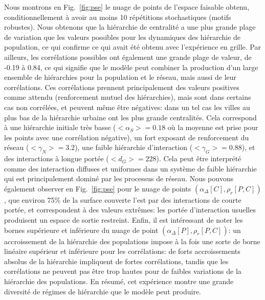 \documentclass[english,fleqn,allpages]{ISTE_science}[2018/07/30]
\begin{document}
{Nous montrons en Fig.~\ref{fig:pse} le nuage de points de l'espace faisable obtenu, conditionnellement à avoir au moins 10 répétitions stochastiques (motifs robustes). Nous obtenons que la hiérarchie de centralité a une plus grande plage de variation que les valeurs possibles pour les dynamiques des hiérarchie de population, ce qui confirme ce qui avait été obtenu avec l'expérience en grille. Par ailleurs, les corrélations possibles ont également une grande plage de valeur, de -0.19 à 0.84, ce qui signifie que le modèle peut combiner la production d'un large ensemble de hiérarchies pour la population et le réseau, mais aussi de leur corrélations. Ces corrélations prennent principalement des valeurs positives comme attendu (renforcement mutuel des hiérarchies), mais sont dans certains cas non corrélées, et peuvent même être négatives: dans un tel cas les villes au plus bas de la hiérarchie urbaine ont les plus grande centralités. Cela correspond à une hiérarchie initiale très basse ($<\alpha_S>=0.18$ où la moyenne est prise pour les points avec une corrélation négative), un fort exposant de renforcement du réseau ($<\gamma_N>=3.2$), une faible hiérarchie d'interaction ($<\gamma_G>=0.88$), et des interactions à longue portée ($<d_G>=228$). Cela peut être interprété comme des interaction diffuses et uniformes dans un système de faible hiérarchie qui est principalement dominé par les processus de réseau. Nous pouvons également observer en Fig.~\ref{fig:pse} pour le nuage de points $(\alpha_{\Delta}\left[C\right],\rho_r\left[P,C\right])$, que environ 75\% de la surface couverte l'est par des interactions de courte portée, et correspondent à des valeurs extrêmes: les portée d'interaction usuelles produisent un espace de sortie restreint. Enfin, il est intéressant de noter les bornes supérieure et inférieure du nuage de point $(\alpha_{\Delta}\left[P\right],\rho_r\left[P,C\right])$: un accroissement de la hiérarchie des populations impose à la fois une sorte de borne linéaire supérieur et inférieure pour les corrélations: de forts accroissements absolus de la hiérarchie impliquent de fortes corrélations, tandis que les corrélations ne peuvent pas être trop hautes pour de faibles variations de la hiérarchie des populations. En résumé, cet expérience montre une grande diversité de régimes de hiérarchie que le modèle peut produire.
}
\end{document}
